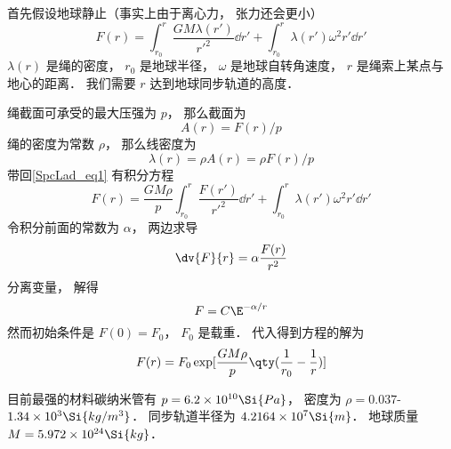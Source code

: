 
首先假设地球静止（事实上由于离心力， 张力还会更小）
\begin{equation}\label{SpcLad_eq1}
F(r) = \int_{r_0}^{r} \frac{GM\lambda(r')}{r'^2} \dd{r'} + \int_{r_0}^r \lambda(r') \omega^2 r' \dd{r'}
\end{equation}
$\lambda(r)$ 是绳的密度， $r_0$ 是地球半径， $\omega$ 是地球自转角速度， $r$ 是绳索上某点与地心的距离． 我们需要 $r$ 达到地球同步轨道的高度．

绳截面可承受的最大压强为 $p$， 那么截面为
\begin{equation}
A(r) = F(r)/p
\end{equation}
绳的密度为常数 $\rho$， 那么线密度为
\begin{equation}
\lambda(r) = \rho A(r) = \rho F(r)/p
\end{equation}
带回\autoref{SpcLad_eq1} 有积分方程
\begin{equation}
F(r) = \frac{GM\rho}{p} \int_{r_0}^{r} \frac{F(r')}{r'^2} \dd{r'} + \int_{r_0}^r \lambda(r') \omega^2 r' \dd{r'}
\end{equation}
令积分前面的常数为 $\alpha$， 两边求导
\begin{equation}
\dv{F}{r} = \alpha \frac{F(r)}{r^2}
\end{equation}
分离变量， 解得
\begin{equation}
F = C\E^{-\alpha/r}
\end{equation}
然而初始条件是 $F(0) = F_0$， $F_0$ 是载重． 代入得到方程的解为
\begin{equation}
F(r) = F_0 \exp[\frac{GM\rho}{p} \qty(\frac{1}{r_0} - \frac{1}{r})]
\end{equation}

目前最强的材料碳纳米管有 $p = 6.2\times 10^{10} \Si{Pa}$， 密度为 $\rho = 0.037$-$1.34\times 10^{3} \Si{kg/m^3}$． 同步轨道半径为 $4.2164\times 10^7 \Si{m}$． 地球质量 $M = 5.972 \times 10^{24} \Si{kg}$．
